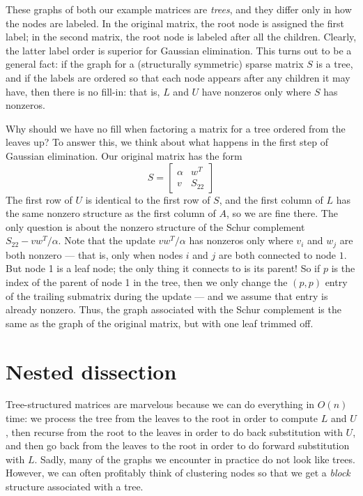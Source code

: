 \documentclass[12pt, leqno]{article} %
\begin{document}
These graphs of both our example matrices are {\em trees}, and they
differ only in how the nodes are labeled.  In the original matrix, the
root node is assigned the first label; in the second matrix, the root
node is labeled after all the children.  Clearly, the latter label
order is superior for Gaussian elimination.  This turns out to be a
general fact: if the graph for a (structurally symmetric) sparse
matrix $S$ is a tree, and if the labels are ordered so that each node
appears after any children it may have, then there is no fill-in: that
is, $L$ and $U$ have nonzeros only where $S$ has nonzeros.

Why should we have no fill when factoring a matrix for a tree ordered
from the leaves up?  To answer this, we think about what happens in the
first step of Gaussian elimination.  Our original matrix has the form
\[
  S = \begin{bmatrix} \alpha & w^T \\ v & S_{22} \end{bmatrix}
\]
The first row of $U$ is identical to the first row of $S$,
and the first column of $L$ has the same nonzero structure
as the first column of $A$, so we are fine there.
The only question is about the nonzero structure of the Schur
complement $S_{22}-vw^T/\alpha$.  Note that the update $vw^T/\alpha$
has nonzeros only where $v_i$ and $w_j$ are both nonzero --- that is,
only when nodes $i$ and $j$ are both connected to node $1$.  But node
1 is a leaf node; the only thing it connects to is its parent!  So if
$p$ is the index of the parent of node 1 in the tree, then we only
change the $(p,p)$ entry of the trailing submatrix during the update
--- and we assume that entry is already nonzero.  Thus, the graph
associated with the Schur complement is the same as the graph of the
original matrix, but with one leaf trimmed off.

\section{Nested dissection}

Tree-structured matrices are marvelous because we can do everything in
$O(n)$ time: we process the tree from the leaves to the root in order
to compute $L$ and $U$, then recurse from the root to the leaves in
order to do back substitution with $U$, and then go back from the
leaves to the root in order to do forward substitution with $L$.
Sadly, many of the graphs we encounter in practice do not look like trees.
However, we can often profitably think of clustering nodes so that we get
a {\em block} structure associated with a tree.
\end{document}
